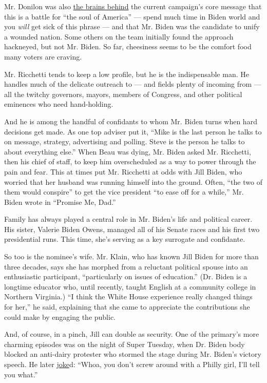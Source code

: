 Mr. Donilon was also
\href{https://www.politico.com/news/magazine/2019/12/19/biden-2020-campaign-president-advisers-087410}{the
brains behind} the current campaign's core message that this is a battle
for ``the soul of America'' --- spend much time in Biden world and you
\emph{will} get sick of this phrase --- and that Mr. Biden was the
candidate to unify a wounded nation. Some others on the team initially
found the approach hackneyed, but not Mr. Biden. So far, cheesiness
seems to be the comfort food many voters are craving.

Mr. Ricchetti tends to keep a low profile, but he is the indispensable
man. He handles much of the delicate outreach to --- and fields plenty
of incoming from --- all the twitchy governors, mayors, members of
Congress, and other political eminences who need hand-holding.

And he is among the handful of confidants to whom Mr. Biden turns when
hard decisions get made. As one top adviser put it, ``Mike is the last
person he talks to on message, strategy, advertising and polling. Steve
is the person he talks to about everything else.'' When Beau was dying,
Mr. Biden asked Mr. Ricchetti, then his chief of staff, to keep him
overscheduled as a way to power through the pain and fear. This at times
put Mr. Ricchetti at odds with Jill Biden, who worried that her husband
was running himself into the ground. Often, ``the two of them would
conspire'' to get the vice president ``to ease off for a while,'' Mr.
Biden wrote in ``Promise Me, Dad.''

Family has always played a central role in Mr. Biden's life and
political career. His sister, Valerie Biden Owens, managed all of his
Senate races and his first two presidential runs. This time, she's
serving as a key surrogate and confidante.

So too is the nominee's wife. Mr. Klain, who has known Jill Biden for
more than three decades, says she has morphed from a reluctant political
spouse into an enthusiastic participant, ``particularly on issues of
education.'' (Dr. Biden is a longtime educator who, until recently,
taught English at a community college in Northern Virginia.) ``I think
the White House experience really changed things for her,'' he said,
explaining that she came to appreciate the contributions she could make
by engaging the public.

And, of course, in a pinch, Jill can double as security. One of the
primary's more charming episodes was on the night of Super Tuesday, when
Dr. Biden body blocked an anti-dairy protester who stormed the stage
during Mr. Biden's victory speech. He later
\href{https://thehill.com/homenews/campaign/486064-biden-on-wife-blocking-protester-whoa-you-dont-screw-around-with-a-philly}{joke}d:
``Whoa, you don't screw around with a Philly girl, I'll tell you what.''

